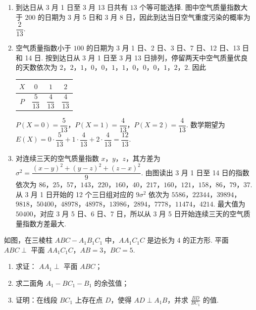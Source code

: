 \begin{solution}
\begin{enumerate}
\item 到达日从 3 月 1 日至 3 月 13 日共有 \(13\) 个等可能选择. 图中空气质量指数大于 \(200\) 的日期为 3 月 5 日和 3 月 8 日，因此到达当日空气重度污染的概率为 \(\dfrac{2}{13}\).

\item 空气质量指数小于 \(100\) 的日期为 3 月 1 日、2 日、3 日、7 日、12 日、13 日和 14 日. 按到达日从 3 月 1 日至 3 月 13 日排列，停留两天中空气质量优良的天数依次为
\(2\)，\(2\)，\(1\)，\(0\)，\(0\)，\(1\)，\(1\)，\(0\)，\(0\)，\(0\)，\(1\)，\(2\)，\(2\). 因此
\begin{center}
\begin{tabular}{c|ccc}
\(X\) & \(0\) & \(1\) & \(2\) \\
\hline
\(P\) & \(\dfrac{5}{13}\) & \(\dfrac{4}{13}\) & \(\dfrac{4}{13}\)
\end{tabular}
\end{center}
\(P(X=0)=\dfrac5{13}\)，\(P(X=1)=\dfrac4{13}\)，\(P(X=2)=\dfrac4{13}\). 数学期望为
\(E(X)=0\cdot\dfrac5{13}+1\cdot\dfrac4{13}+2\cdot\dfrac4{13}=\dfrac{12}{13}\).

\item 对连续三天的空气质量指数 \(x\)，\(y\)，\(z\)，其方差为
\(\sigma^2=\dfrac{(x-y)^2+(y-z)^2+(z-x)^2}{9}\). 由图读出 3 月 1 日至 14 日的指数依次为
\(86\)，\(25\)，\(57\)，\(143\)，\(220\)，\(160\)，\(40\)，\(217\)，\(160\)，\(121\)，\(158\)，\(86\)，\(79\)，\(37\). 从 3 月 1 日开始的 12 个三日组对应的 \(9\sigma^2\) 依次为
\(5586\)，\(22344\)，\(39894\)，\(9818\)，\(50400\)，\(48978\)，\(48978\)，\(13986\)，\(2894\)，\(7778\)，\(11474\)，\(4214\). 最大值为 \(50400\)，对应 3 月 5 日、6 日、7 日，所以从 3 月 5 日开始连续三天的空气质量指数方差最大.
\end{enumerate}
\end{solution}

\begin{problem}
如图，在三棱柱 \(ABC - A_{1}B_{1}C_{1}\) 中，\(AA_{1}C_{1}C\) 是边长为 4 的正方形. 平面 \(ABC \perp\) 平面 \(AA_{1}C_{1}C\)，\(AB = 3\)，\(BC = 5\).
\begin{enumerate}
\item 求证： \(AA_{1} \perp\) 平面 \(ABC\)；
\item 求二面角 \(A_{1} - BC_{1} - B_{1}\) 的余弦值；
\item 证明：在线段 \(BC_{1}\) 上存在点 \(D\)，使得 \(AD \perp A_{1}B\)，并求 \(\frac{BD}{BC_{1}}\) 的值.
\end{enumerate}
\end{problem}

